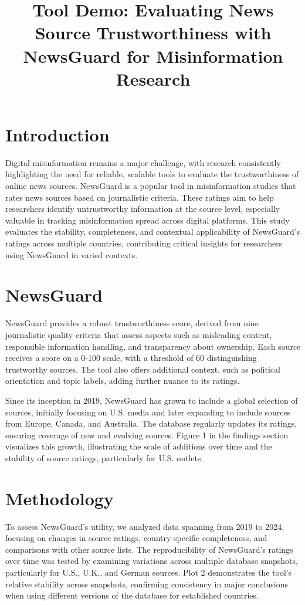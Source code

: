 \documentclass{article}
\title{Tool Demo: Evaluating News Source Trustworthiness with NewsGuard for Misinformation Research}
\begin{document}
\maketitle

\section{Introduction}
Digital misinformation remains a major challenge, with research consistently highlighting the need for reliable, scalable tools to evaluate the trustworthiness of online news sources. 
NewsGuard is a popular tool in misinformation studies that rates news sources based on journalistic criteria. 
These ratings aim to help researchers identify untrustworthy information at the source level, especially valuable in tracking misinformation spread across digital platforms. 
This study evaluates the stability, completeness, and contextual applicability of NewsGuard’s ratings across multiple countries, contributing critical insights for researchers using NewsGuard in varied contexts.


\section{NewsGuard}
NewsGuard provides a robust trustworthiness score, derived from nine journalistic quality criteria that assess aspects such as misleading content, responsible information handling, and transparency about ownership. 
Each source receives a score on a 0-100 scale, with a threshold of 60 distinguishing trustworthy sources. 
The tool also offers additional context, such as political orientation and topic labels, adding further nuance to its ratings.

Since its inception in 2019, NewsGuard has grown to include a global selection of sources, initially focusing on U.S. media and later expanding to include sources from Europe, Canada, and Australia. 
The database regularly updates its ratings, ensuring coverage of new and evolving sources. 
Figure 1 in the findings section visualizes this growth, illustrating the scale of additions over time and the stability of source ratings, particularly for U.S. outlets.

\section{Methodology}
To assess NewsGuard's utility, we analyzed data spanning from 2019 to 2024, focusing on changes in source ratings, country-specific completeness, and comparisons with other source lists. 
The reproducibility of NewsGuard’s ratings over time was tested by examining variations across multiple database snapshots, particularly for U.S., U.K., and German sources. 
Plot 2 demonstrates the tool’s relative stability across snapshots, confirming consistency in major conclusions when using different versions of the database for established countries.
\end{document}
